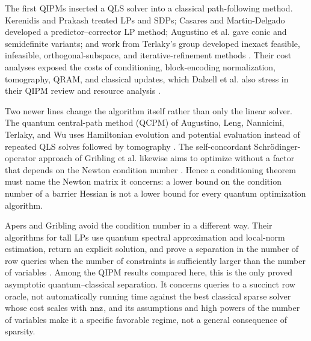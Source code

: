 The first QIPMs inserted a QLS solver into a classical path-following
method.  Kerenidis and Prakash treated LPs and SDPs; Casares and
Martin-Delgado developed a predictor--corrector LP method; Augustino et al.
gave conic and semidefinite variants; and work from Terlaky's group
developed inexact feasible, infeasible, orthogonal-subspace, and
iterative-refinement methods
\cite{kerenidis2020-quantum-interior-point-method-lps,
casares2020-quantum-interior-point-predictor-corrector,
augustino2023-quantum-interior-point-methods-semidefinite,
brandon2023-quantum-interior-point-methods-conic,
augustino2021-an-infeasible-inexact-quantum-interior,
augustino2022-quantum-interior-point-methods-for,
wu2023-inexact-feasible-quantum-interior-point,
mohammadisiahroudi2024-efficient-use-quantum-linear-system,
mohammadisiahroudi2025-inexact-feasible-interior-point-method}.
Their cost analyses exposed the costs of conditioning, block-encoding
normalization, tomography, QRAM, and classical updates, which Dalzell et al.
also stress in their QIPM review and resource analysis
\cite{dalzell2025-quantum-interior-point-methods,
dalzell2023-end-end-resource-analysis-quantum}.

Two newer lines change the algorithm itself rather than only the linear
solver.  The quantum central-path method (QCPM) of Augustino, Leng,
Nannicini, Terlaky, and Wu uses Hamiltonian evolution and potential
evaluation instead of repeated QLS solves followed by tomography
\cite{augustino2024-quantum-central-path-algorithm-linear}.  The
self-concordant Schr\"odinger-operator approach of Gribling et al. likewise
aims to optimize without a factor that depends on the Newton condition number
\cite{gribling2025-self-concordant-schrodinger-operators-spectral}.  Hence a
conditioning theorem must name the Newton matrix it concerns: a lower bound
on the condition number of a barrier Hessian is not a lower bound for every
quantum optimization algorithm.

Apers and Gribling avoid the condition number in a different way.  Their
algorithms for tall LPs use quantum spectral approximation and local-norm
estimation, return an explicit solution, and prove a separation in the number
of row queries when the number of constraints is sufficiently larger than the
number of variables
\cite{apers2026-quantum-speedups-linear-programming-interior}.  Among the
QIPM results compared here, this is the only proved asymptotic
quantum--classical separation.  It concerns queries to a succinct row
oracle, not automatically running time against the best classical sparse
solver whose cost scales with \(\operatorname{nnz}\), and its assumptions and high powers
of the number of variables make it a specific favorable regime, not a
general consequence of sparsity.

